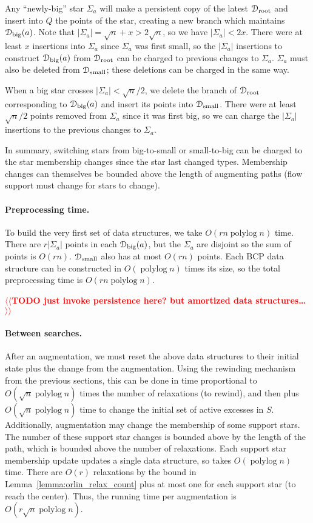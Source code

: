 \documentclass[11pt]{article}
\makeatletter
\def\polylog{\mathop{\mathrm{polylog}}}
\def\abs#1{\mathopen| #1 \mathclose|}		%
\theoremstyle{plain}
\numberwithin{figure}{section}
\def\n@te#1{\textsf{\boldmath \textbf{$\langle\!\langle$#1$\rangle\!\rangle$}}\leavevmode}
\def\note#1{\textcolor{red}{\n@te{#1}}}
\makeatother
\begin{document}
Any ``newly-big'' star $\Sigma_a$ will make a persistent copy of the latest
$\EuScript{D}_\text{root}$ and insert into $Q$ the points of the star,
creating a new branch which maintains $\EuScript{D}_\text{big}(a)$.
Note that $\abs{\Sigma_a} = \sqrt{n} + x > 2\sqrt{n}$, so we have
$\abs{\Sigma_a} < 2x$.
There were at least $x$ insertions into $\Sigma_a$ since $\Sigma_a$ was first
small, so the $\abs{\Sigma_a}$ insertions to construct
$\EuScript{D}_\text{big}(a)$ from $\EuScript{D}_\text{root}$ can be charged to
previous changes to $\Sigma_a$.
$\Sigma_a$ must also be deleted from $\EuScript{D}_\text{small}$;
these deletions can be charged in the same way.

When a big star crosses $\abs{\Sigma_a} < \sqrt{n}/2$, we delete the branch of
$\EuScript{D}_\text{root}$ corresponding to $\EuScript{D}_\text{big}(a)$ and
insert its points into $\EuScript{D}_\text{small}$.
There were at least $\sqrt{n}/2$ points removed from $\Sigma_a$ since it was
first big, so we can charge the $\abs{\Sigma_a}$ insertions to the previous
changes to $\Sigma_a$.

In summary, switching stars from big-to-small or small-to-big can be charged to
the star membership changes since the star last changed types.
Membership changes can themselves be bounded above the length of augmenting
paths (flow support must change for stars to change).

\paragraph{Preprocessing time.}
To build the very first set of data structures, we take $O(rn\polylog n)$ time.
There are $r\abs{\Sigma_a}$ points in each $\EuScript{D}_\text{big}(a)$,
but the $\Sigma_a$ are disjoint so the sum of points is $O(rn)$.
$\EuScript{D}_\text{small}$ also has at most $O(rn)$ points.
Each BCP data structure can be constructed in $O(\polylog n)$ times its size,
so the total preprocessing time is $O(rn\polylog n)$.

\note{TODO just invoke persistence here? but amortized data structures\dots} %
\paragraph{Between searches.}
After an augmentation, we must reset the above data structures to their initial
state plus the change from the augmentation.
Using the rewinding mechanism from the previous sections, this can be done in
time proportional to $O(\sqrt{n}\polylog n)$ times the number of relaxations
(to rewind), and then plus $O(\sqrt{n}\polylog n)$ time to change the initial
set of active excesses in $S$.
Additionally, augmentation may change the membership of some support stars.
The number of these support star changes is bounded above by the length of the
path, which is bounded above the number of relaxations.
Each support star membership update updates a single data structure,
so takes $O(\polylog n)$ time.
There are $O(r)$ relaxations by the bound in
Lemma~\ref{lemma:orlin_relax_count} plus at most one for each support star
(to reach the center).
Thus, the running time per augmentation is $O(r\sqrt{n}\polylog n)$.
\end{document}
